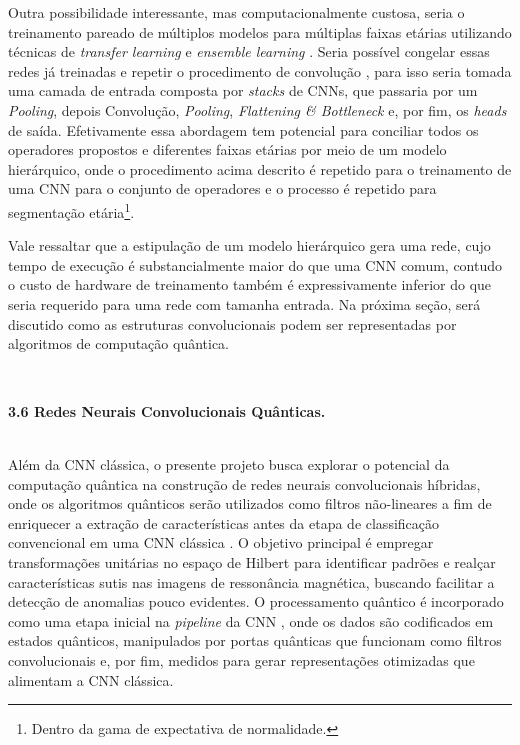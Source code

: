 \documentclass[a4paper, 12pt]{report}
\begin{document}
Outra possibilidade interessante, mas computacionalmente custosa, seria o treinamento pareado de múltiplos modelos para múltiplas faixas etárias utilizando técnicas de \textit{transfer learning} e \textit{ensemble learning} \cite{Xue2020}. Seria possível congelar essas redes já treinadas e repetir o procedimento de convolução \cite{Jha2024, Iman2023}, para isso seria tomada uma camada de entrada composta por \textit{stacks} de CNNs, que passaria por um \textit{Pooling}, depois Convolução, \textit{Pooling}, \textit{Flattening \& Bottleneck} e, por fim, os \textit{heads} de saída. Efetivamente essa abordagem tem potencial para conciliar todos os operadores propostos e diferentes faixas etárias por meio de um modelo hierárquico, onde o procedimento acima descrito é repetido para o treinamento de uma CNN para o conjunto de operadores e o processo é repetido para segmentação etária\footnote{Dentro da gama de expectativa de normalidade.}. 

Vale ressaltar que a estipulação de um modelo hierárquico gera uma rede, cujo tempo de execução é substancialmente maior do que uma CNN comum, contudo o custo de hardware de treinamento também é expressivamente inferior do que seria requerido para uma rede com tamanha entrada. Na próxima seção, será discutido como as estruturas convolucionais podem ser representadas por algoritmos de computação quântica.

$\frac{}{}$\\
\begin{Large}
	\textbf{3.6 Redes Neurais Convolucionais Quânticas.}
\end{Large}
$\frac{}{}$\\


Além da CNN clássica, o presente projeto busca explorar o potencial da computação quântica na construção de redes neurais convolucionais híbridas, onde os algoritmos quânticos serão utilizados como filtros não-lineares a fim de enriquecer a extração de características antes da etapa de classificação convencional em uma CNN clássica \cite{Garg2020}. O objetivo principal é empregar transformações unitárias no espaço de Hilbert para identificar padrões e realçar características sutis nas imagens de ressonância magnética, buscando facilitar a detecção de anomalias pouco evidentes. O processamento quântico é incorporado como uma etapa inicial na \textit{pipeline} da CNN \cite{Oh}, onde os dados são codificados em estados quânticos, manipulados por portas quânticas que funcionam como filtros convolucionais e, por fim, medidos para gerar representações otimizadas que alimentam a CNN clássica.
\end{document}
